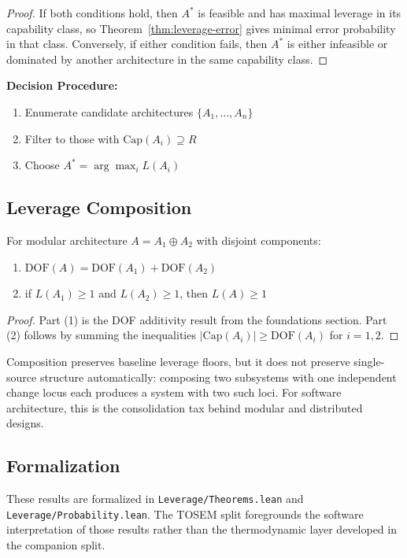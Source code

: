 \begin{proof}
If both conditions hold, then $A^*$ is feasible and has maximal leverage in its capability class, so Theorem~\ref{thm:leverage-error} gives minimal error probability in that class. Conversely, if either condition fails, then $A^*$ is either infeasible or dominated by another architecture in the same capability class.
\end{proof}

\textbf{Decision Procedure:}
\begin{enumerate}
\item Enumerate candidate architectures $\{A_1, \ldots, A_n\}$
\item Filter to those with $\mathrm{Cap}(A_i) \supseteq R$
\item Choose $A^* = \arg\max_i L(A_i)$
\end{enumerate}

\subsection{Leverage Composition}

\begin{theorem}\label{thm:composition}
For modular architecture $A = A_1 \oplus A_2$ with disjoint components:
\begin{enumerate}
\item $\mathrm{DOF}(A) = \mathrm{DOF}(A_1) + \mathrm{DOF}(A_2)$
\item if $L(A_1) \ge 1$ and $L(A_2) \ge 1$, then $L(A) \ge 1$
\end{enumerate}
\end{theorem}

\begin{proof}
Part (1) is the DOF additivity result from the foundations section. Part (2) follows by summing the inequalities $|\mathrm{Cap}(A_i)| \ge \mathrm{DOF}(A_i)$ for $i=1,2$.
\end{proof}

\begin{remark}\label{rem:composition-breaks-ssot}
Composition preserves baseline leverage floors, but it does not preserve single-source structure automatically: composing two subsystems with one independent change locus each produces a system with two such loci. For software architecture, this is the consolidation tax behind modular and distributed designs.
\end{remark}

\subsection{Formalization}

These results are formalized in \texttt{Leverage/Theorems.lean} and \texttt{Leverage/Probability.lean}. The TOSEM split foregrounds the software interpretation of those results rather than the thermodynamic layer developed in the companion split.
